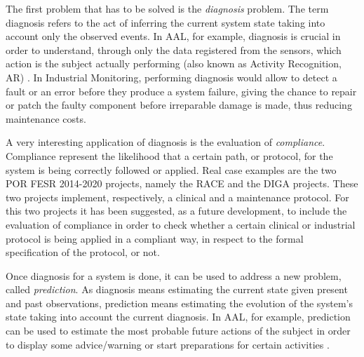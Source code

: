 \documentclass{article}
\begin{document}
        The first problem that has to be solved is the \textit{diagnosis} problem. The term diagnosis refers to the act of inferring the current system state taking into account only the observed events. In AAL, for example, diagnosis is crucial in order to understand, through only the data registered from the sensors, which action is the subject actually performing (also known as Activity Recognition, AR) \cite{carnevali2015continuous}. In Industrial Monitoring, performing diagnosis would allow to detect a fault or an error before they produce a system failure, giving the chance to repair or patch the faulty component before irreparable damage is made, thus reducing maintenance costs.
        
        A very interesting application of diagnosis is the evaluation of \textit{compliance}. Compliance represent the likelihood that a certain path, or protocol, for the system is being correctly followed or applied. Real case examples are the two POR FESR 2014-2020 projects, namely the RACE and the DIGA projects. These two projects implement, respectively, a clinical and a maintenance protocol. For this two projects it has been suggested, as a future development, to include the evaluation of compliance in order to check whether a certain clinical or industrial protocol is being applied in a compliant way, in respect to the formal specification of the protocol, or not.
        
        Once diagnosis for a system is done, it can be used to address a new problem, called \textit{prediction}. As diagnosis means estimating the current state given present and past observations, prediction means estimating the evolution of the system's state taking into account the current diagnosis. In AAL, for example, prediction can be used to estimate the most probable future actions of the subject in order to display some advice/warning or start preparations for certain activities \cite{epew16}.
        
\end{document}
